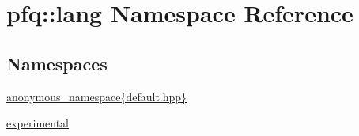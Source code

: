 \hypertarget{namespacepfq_1_1lang}{\section{pfq\+:\+:lang Namespace Reference}
\label{namespacepfq_1_1lang}
}
\subsection*{Namespaces}
\begin{DoxyCompactItemize}
\item 
 \hyperlink{namespacepfq_1_1lang_1_1anonymous__namespace_02default_8hpp_03}{anonymous\+\_\+namespace\{default.\+hpp\}}
\item 
 \hyperlink{namespacepfq_1_1lang_1_1experimental}{experimental}
\end{DoxyCompactItemize}
